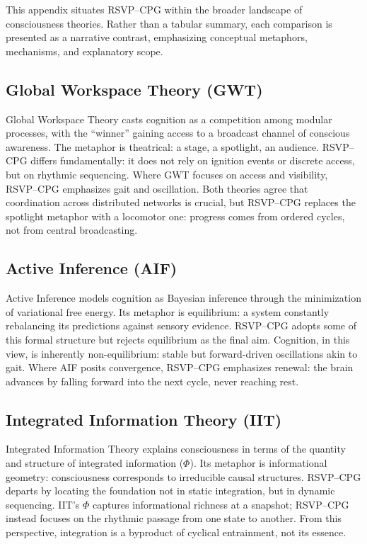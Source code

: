 \documentclass{article}
\begin{document}
This appendix situates RSVP--CPG within the broader landscape of consciousness theories. 
Rather than a tabular summary, each comparison is presented as a narrative contrast, 
emphasizing conceptual metaphors, mechanisms, and explanatory scope.  

\subsection{Global Workspace Theory (GWT)}
Global Workspace Theory casts cognition as a competition among modular processes, 
with the ``winner'' gaining access to a broadcast channel of conscious awareness.  
The metaphor is theatrical: a stage, a spotlight, an audience. RSVP--CPG differs fundamentally: 
it does not rely on ignition events or discrete access, but on rhythmic sequencing.  
Where GWT focuses on access and visibility, RSVP--CPG emphasizes gait and oscillation.  
Both theories agree that coordination across distributed networks is crucial, 
but RSVP--CPG replaces the spotlight metaphor with a locomotor one: 
progress comes from ordered cycles, not from central broadcasting.  

\subsection{Active Inference (AIF)}
Active Inference models cognition as Bayesian inference through the minimization 
of variational free energy. Its metaphor is equilibrium: a system constantly rebalancing 
its predictions against sensory evidence. RSVP--CPG adopts some of this formal structure 
but rejects equilibrium as the final aim. Cognition, in this view, is inherently 
non-equilibrium: stable but forward-driven oscillations akin to gait.  
Where AIF posits convergence, RSVP--CPG emphasizes renewal: the brain advances by 
falling forward into the next cycle, never reaching rest.  

\subsection{Integrated Information Theory (IIT)}
Integrated Information Theory explains consciousness in terms of the quantity and 
structure of integrated information (\(\Phi\)). Its metaphor is informational geometry: 
consciousness corresponds to irreducible causal structures. RSVP--CPG departs by 
locating the foundation not in static integration, but in dynamic sequencing.  
IIT’s $\Phi$ captures informational richness at a snapshot; RSVP--CPG instead focuses 
on the rhythmic passage from one state to another. From this perspective, integration 
is a byproduct of cyclical entrainment, not its essence.  
\end{document}
